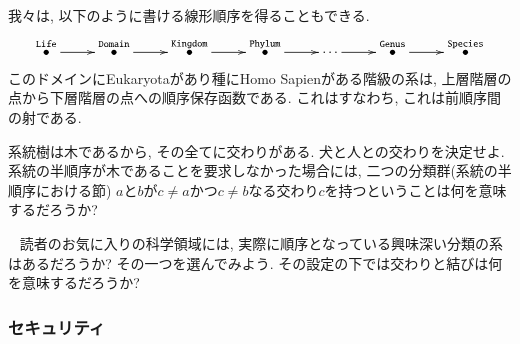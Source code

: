 我々は, 以下のように書ける線形順序を得ることもできる.
$$
\xymatrix{\LTO{Life}\ar[r]&\LTO{Domain}\ar[r]&\LTO{Kingdom}\ar[r]&\LTO{Phylum}\ar[r]&\cdots\ar[r]&\LTO{Genus}\ar[r]&\LTO{Species}}
$$
このドメインにEukaryotaがあり種にHomo Sapienがある階級の系は, 上層階層の点から下層階層の点への順序保存函数である. これはすなわち, これは前順序間の射である.

\begin{exercise}
系統樹は木であるから, その全てに交わりがある. 
\sexc 犬と人との交わりを決定せよ.
\next 系統の半順序が木であることを要求しなかった場合には, 二つの分類群(系統の半順序における節) $a$と$b$が$c\neq a$かつ$c\neq b$なる交わり$c$を持つということは何を意味するだろうか?
\endsexc
\end{exercise}

\begin{exercise}~
\sexc 読者のお気に入りの科学領域には, 実際に順序となっている興味深い分類の系はあるだろうか?
\next その一つを選んでみよう. その設定の下では交わりと結びは何を意味するだろうか?
\endsexc
\end{exercise}


\subsubsection{セキュリティ}



